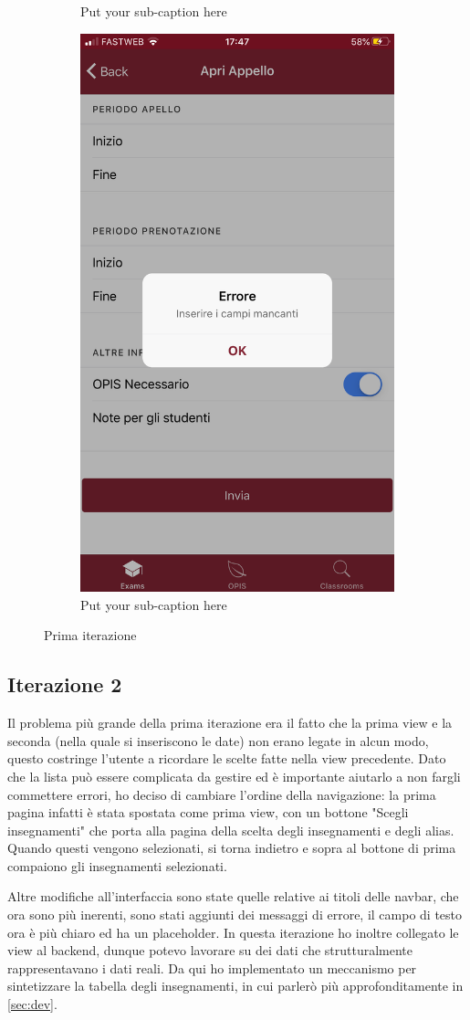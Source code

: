 \documentclass[Lau, oneside]{sapthesis}%
\begin{document}
\begin{figure}[ht]
\begin{subfigure}{0.6\textwidth}
		\caption{Put your sub-caption here}
		\label{fig:sub-second}
	  \end{subfigure}
	  \begin{subfigure}{0.6\textwidth}
		\centering
		\includegraphics[width=0.5\linewidth]{ui-iterations/i/error-form}  
		\caption{Put your sub-caption here}
		\label{fig:sub-second}
	  \end{subfigure}
	  
	\caption{Prima iterazione}
	\label{fig:fig}
\end{figure}	

\subsection{Iterazione 2}
Il problema più grande della prima iterazione era il fatto che la prima view e la seconda (nella quale si inseriscono le date) non erano legate in alcun modo, questo costringe l'utente a ricordare le scelte fatte nella view precedente. Dato che la lista può essere complicata da gestire ed è importante aiutarlo a non fargli commettere errori, ho deciso di cambiare l'ordine della navigazione: la prima pagina infatti è stata spostata come prima view, con un bottone "Scegli insegnamenti" che porta alla pagina della scelta degli insegnamenti e degli alias. Quando questi vengono selezionati, si torna indietro e sopra al bottone di prima compaiono gli insegnamenti selezionati.

Altre modifiche all'interfaccia sono state quelle relative ai titoli delle navbar, che ora sono più inerenti, sono stati aggiunti dei messaggi di errore, il campo di testo ora è più chiaro ed ha un placeholder. In questa iterazione ho inoltre collegato le view al backend, dunque potevo lavorare su dei dati che strutturalmente rappresentavano i dati reali. Da qui ho implementato un meccanismo per sintetizzare la tabella degli insegnamenti, in cui parlerò più approfonditamente in \ref{sec:dev}.
\end{document}
